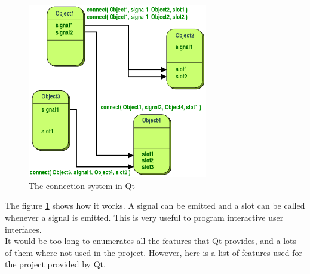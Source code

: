 \begin{figure}[H]
	\centering
	\includegraphics[width=0.7\textwidth]{images/abstract-connections.png}
	 \caption{The connection system in Qt}
	 \label{signal-slot-qt}
\end{figure}

The figure \ref{signal-slot-qt} shows how it works.
A signal can be emitted and a slot can be called whenever a signal is emitted. This is very useful to program interactive user interfaces.\\
It would be too long to enumerates all the features that Qt provides, and a lots of them where not used in the project. However, here is a list of features used for the project provided by Qt.

